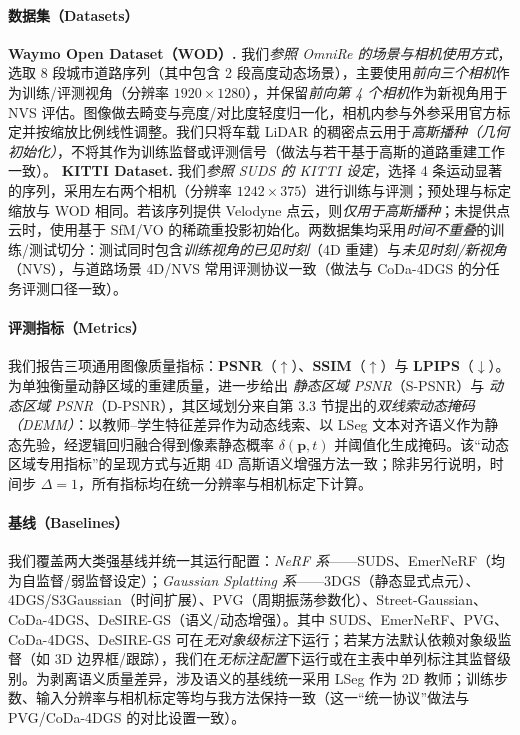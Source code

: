 \documentclass[10pt,conference]{IEEEtran} %
\begin{document}
\paragraph{数据集（Datasets）}
\textbf{Waymo Open Dataset（WOD）.} 我们\emph{参照 OmniRe 的场景与相机使用方式}，选取 8 段城市道路序列（其中包含 2 段高度动态场景），主要使用\emph{前向三个相机}作为训练/评测视角（分辨率 \(1920\times1280\)），并保留\emph{前向第 4 个相机}作为新视角用于 NVS 评估。图像做去畸变与亮度/对比度轻度归一化，相机内参与外参采用官方标定并按缩放比例线性调整。我们只将车载 LiDAR 的稠密点云用于\emph{高斯播种（几何初始化）}，不将其作为训练监督或评测信号（做法与若干基于高斯的道路重建工作一致）。  
\textbf{KITTI Dataset.} 我们\emph{参照 SUDS 的 KITTI 设定}，选择 4 条运动显著的序列，采用左右两个相机（分辨率 \(1242\times375\)）进行训练与评测；预处理与标定缩放与 WOD 相同。若该序列提供 Velodyne 点云，则\emph{仅用于高斯播种}；未提供点云时，使用基于 SfM/VO 的稀疏重投影初始化。两数据集均采用\emph{时间不重叠}的训练/测试切分：测试同时包含\emph{训练视角的已见时刻}（4D 重建）与\emph{未见时刻/新视角}（NVS），与道路场景 4D/NVS 常用评测协议一致（做法与 CoDa\mbox{-}4DGS 的分任务评测口径一致）。

\paragraph{评测指标（Metrics）}
我们报告三项通用图像质量指标：\textbf{PSNR}（\(\uparrow\)）、\textbf{SSIM}（\(\uparrow\)）与 \textbf{LPIPS}（\(\downarrow\)）。为单独衡量动静区域的重建质量，进一步给出 \emph{静态区域 PSNR}（S\mbox{-}PSNR）与 \emph{动态区域 PSNR}（D\mbox{-}PSNR），其区域划分来自第 3.3 节提出的\emph{双线索动态掩码（DEMM）}：以教师–学生特征差异作为动态线索、以 LSeg 文本对齐语义作为静态先验，经逻辑回归融合得到像素静态概率 \(\delta(\mathbf p,t)\) 并阈值化生成掩码。该“动态区域专用指标”的呈现方式与近期 4D 高斯语义增强方法一致；除非另行说明，时间步 \(\Delta{=}1\)，所有指标均在统一分辨率与相机标定下计算。

\paragraph{基线（Baselines）}
我们覆盖两大类强基线并统一其运行配置：\emph{NeRF 系}——SUDS、EmerNeRF（均为自监督/弱监督设定）；\emph{Gaussian Splatting 系}——3DGS（静态显式点元）、4DGS/S3Gaussian（时间扩展）、PVG（周期振荡参数化）、Street\mbox{-}Gaussian、CoDa\mbox{-}4DGS、DeSIRE\mbox{-}GS（语义/动态增强）。其中 SUDS、EmerNeRF、PVG、CoDa\mbox{-}4DGS、DeSIRE\mbox{-}GS 可在\emph{无对象级标注}下运行；若某方法默认依赖对象级监督（如 3D 边界框/跟踪），我们在\emph{无标注配置}下运行或在主表中单列标注其监督级别。为剥离语义质量差异，涉及语义的基线统一采用 LSeg 作为 2D 教师；训练步数、输入分辨率与相机标定等均与我方法保持一致（这一“统一协议”做法与 PVG/CoDa\mbox{-}4DGS 的对比设置一致）。
\end{document}
